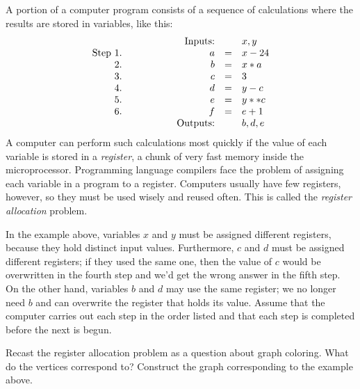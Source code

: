 \documentclass[12pt,twoside]{article}
\begin{document}
\begin{problem}{16} 
A portion of a computer program consists of a sequence of calculations
where the results are stored in variables, like this:
\[
\begin{array}{rrrcl}
&& \text{Inputs:} &  & x, y \\
\text{Step } 1. & \hspace{0.5in} & a & = & x - 24 \\
2. && b & = & x * a \\
3. && c & = & 3 \\
4. && d & = & y - c \\
5. && e & = & y ** c \\
6. && f & = & e + 1  \\
&& \text{Outputs:} & & b, d, e
\end{array}
\]
A computer can perform such calculations most quickly if the value of
each variable is stored in a \emph{register}, a chunk of very fast
memory inside the microprocessor.  Programming language compilers face
the problem of assigning each variable in a program to a register.
Computers usually have few registers, however, so they must be used
wisely and reused often.  This is called the \emph{register
  allocation} problem.

In the example above, variables $x$ and $y$ must be assigned different
registers, because they hold distinct input values.  Furthermore, $c$
and $d$ must be assigned different registers; if they used the same
one, then the value of $c$ would be overwritten in the fourth step and
we'd get the wrong answer in the fifth step.  On the other hand,
variables $b$ and $d$ may use the same register; we no longer need $b$ and can overwrite the register that holds its
value.  Assume that the computer carries out each step in the order
listed and that each step is completed before the next is begun.

\bparts

 Recast the register allocation problem as a question
about graph coloring.  What do the vertices correspond to?  Construct
the graph corresponding to the example above.

\end{problem}
\end{document}
